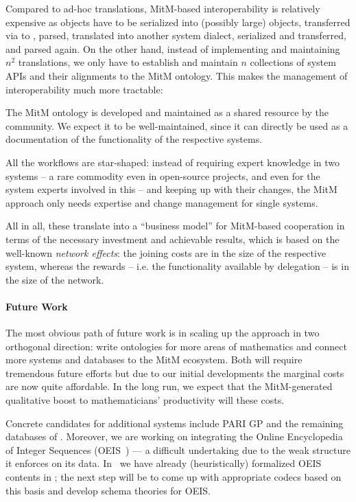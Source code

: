 Compared to ad-hoc translations, MitM-based interoperability is relatively expensive as objects have to be serialized into (possibly large) \OMMT objects, transferred via \SCSCP to \MMT, parsed, translated into another system dialect, serialized and transferred, and parsed again.
On the other hand, instead of implementing and maintaining $n^2$ translations, we only have to establish and maintain $n$ collections of system APIs and their alignments to the
MitM ontology.
This makes the management of interoperability much more tractable:
\begin{compactenum}
\item The MitM ontology is developed and maintained as a shared resource by the community.
We expect it to be well-maintained, since it can directly be used as a documentation of the functionality of the respective systems.
\item All the workflows are star-shaped: instead of requiring expert knowledge in two systems -- a rare commodity even in open-source projects, and even for the system experts involved in this \papertype -- and keeping up with their changes, the MitM approach only needs expertise and change management for single systems.
\end{compactenum}
All in all, these translate into a ``business model'' for MitM-based cooperation in terms of the necessary investment and achievable results, which is based on the well-known \emph{network effects}: the joining costs are in the size of the respective system, whereas the rewards -- i.e. the functionality available by delegation -- is in the size of the network.

\paragraph{Future Work}
The most obvious path of future work is in scaling up the approach in two orthogonal direction: write ontologies for more areas of mathematics and connect more systems and databases to the MitM ecosystem.
Both will require tremendous future efforts but due to our initial developments the marginal costs are now quite affordable.
In the long run, we expect that the MitM-generated qualitative boost to mathematicians' productivity will these costs.

Concrete candidates for additional systems include PARI GP and the remaining databases of \lmfdb.
Moreover, we are working on integrating the Online Encyclopedia of Integer Sequences (OEIS~\cite{Sloane:OEIS,oeis}) --- a difficult undertaking due to the weak structure it enforces on its data.
In~\cite{LuzKoh:fsarfo16} we have already (heuristically) formalized OEIS contents in \ommt; the next step will be to come up with appropriate codecs based on this basis and develop schema theories for OEIS.

